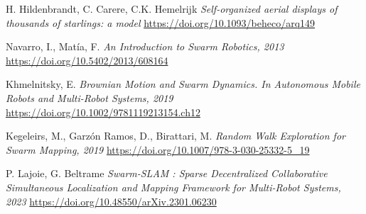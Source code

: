 \documentclass[12pt]{article}
\begin{document}
\begin{thebibliography}{9}

    H. Hildenbrandt, C. Carere, C.K. Hemelrijk
    \textit{Self-organized aerial displays of thousands of starlings: a model}
    \href{https://doi.org/10.1093/beheco/arq149}{https://doi.org/10.1093/beheco/arq149}

    Navarro, I., Matía, F.
    \textit{An Introduction to Swarm Robotics, 2013}
    \href{https://doi.org/10.5402/2013/608164}{https://doi.org/10.5402/2013/608164}

    Khmelnitsky, E.
    \textit{Brownian Motion and Swarm Dynamics. In Autonomous Mobile Robots and Multi-Robot Systems, 2019}
    \href{https://doi.org/10.1002/9781119213154.ch12}{https://doi.org/10.1002/9781119213154.ch12}

    Kegeleirs, M., Garzón Ramos, D., Birattari, M.
    \textit{Random Walk Exploration for Swarm Mapping, 2019}
    \href{https://doi.org/10.1007/978-3-030-25332-5_19}{https://doi.org/10.1007/978-3-030-25332-5_19}

    P. Lajoie, G. Beltrame
    \textit{Swarm-SLAM : Sparse Decentralized Collaborative Simultaneous Localization and Mapping Framework for Multi-Robot Systems, 2023}
    \href{https://doi.org/10.48550/arXiv.2301.06230}{https://doi.org/10.48550/arXiv.2301.06230}

\end{thebibliography}
\end{document}
